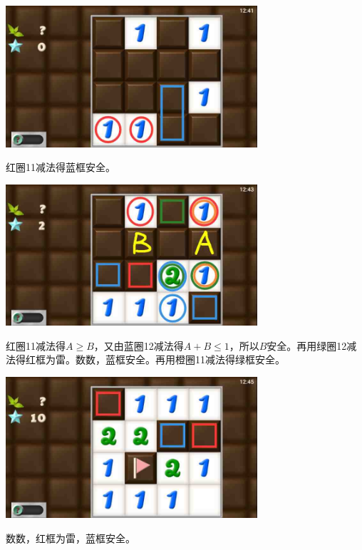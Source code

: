 \subsection{} %
\begin{center}
    \includegraphics[width=0.7\textwidth]{puzzlelow/87-1.jpg}
\end{center}
红圈11减法得蓝框安全。
\begin{center}
    \includegraphics[width=0.7\textwidth]{puzzlelow/87-2.jpg}
\end{center}
红圈11减法得$A\ge B$，又由蓝圈12减法得$A+B\le 1$，所以$B$安全。再用绿圈12减法得红框为雷。数数，蓝框安全。再用橙圈11减法得绿框安全。
\begin{center}
    \includegraphics[width=0.7\textwidth]{puzzlelow/87-3.jpg}
\end{center}
数数，红框为雷，蓝框安全。

